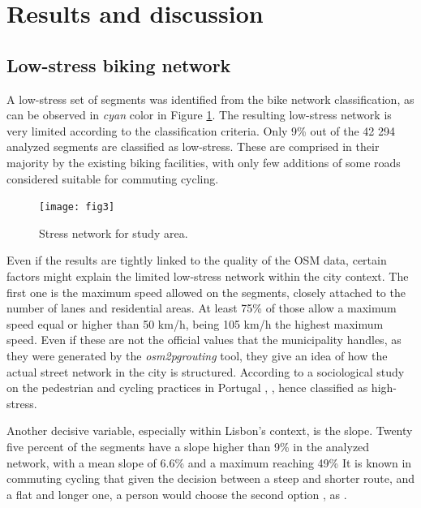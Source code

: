 \documentclass[information,article,submit,moreauthors,pdftex,10pt,a4paper]{mdpi}
\theoremstyle{mdpi}
\newcounter{ex}
\newcounter{re}
\theoremstyle{mdpidefinition}
\begin{document}
\section{Results and discussion} \label{results}

\subsection{Low-stress biking network} \label{low_stress}

A low-stress set of segments was identified from the bike network classification, as can be observed in \textit{cyan} color in Figure \ref{fig3}. The resulting low-stress network is very limited according to the classification criteria. Only 9\% out of the 42 294 analyzed segments are classified as low-stress. These are comprised in their majority by the existing biking facilities, with only few additions of some roads considered suitable for commuting cycling.

\begin{figure}[ht]
	\begin{center}
		\texttt{[image: fig3]}
		\caption{Stress network for study area.}
		\label{fig3}
	\end{center}
\end{figure}

Even if the results are tightly linked to the quality of the OSM data, certain factors might explain the limited low-stress network within the city context. The first one is the maximum speed allowed on the segments, closely attached to the number of lanes and residential areas. At least 75\% of those allow a maximum speed equal or higher than 50 km/h, being 105 km/h the highest maximum speed. Even if these are not the official values that the municipality handles, as they were generated by the \textit{osm2pgrouting} tool, they give an idea of how the actual street network in the city is structured. According to a sociological study on the pedestrian and cycling practices in Portugal \cite[p. 298]{Mantas2015}, , hence classified as high-stress. 

Another decisive variable, especially within Lisbon’s context, is the slope. Twenty five percent of the segments have a slope higher than 9\% in the analyzed network, with a mean slope of 6.6\% and a maximum reaching 49\% It is known in commuting cycling that given the decision between a steep and shorter route, and a flat and longer one, a person would choose the second option \cite{Broach2012}, as  \cite[p.67]{Heinen2010}. 
\end{document}
